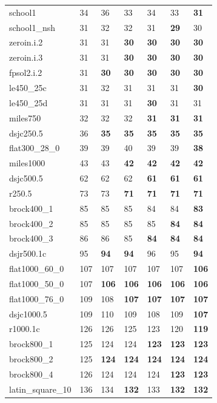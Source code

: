 \documentclass[12pt,a4paper,twoside]{scrartcl}
\numberwithin{equation}{section}
\begin{document}
\begin{table}
\begin{center}
\begin{tabular}{| l | l | l|l|l|l|p{1cm}|}
school1&34&36&33&34&33&\textbf{31}\\ 
school1\_nsh&31&32&32&31&\textbf{29}&30\\ 
zeroin.i.2&31&31&\textbf{30}&\textbf{30}&\textbf{30}&\textbf{30}\\ \hline
zeroin.i.3&31&31&\textbf{30}&\textbf{30}&\textbf{30}&\textbf{30}\\ 
fpsol2.i.2&31&\textbf{30}&\textbf{30}&\textbf{30}&\textbf{30}&\textbf{30}\\ 
le450\_25c&31&32&31&31&31&\textbf{30}\\
le450\_25d&31&31&31&\textbf{30}&31&31\\ 
miles750&32&32&32&\textbf{31}&\textbf{31}&\textbf{31}\\ \hline
dsjc250.5&36&\textbf{35}&\textbf{35}&\textbf{35}&\textbf{35}&\textbf{35}\\ 
flat300\_28\_0&39&39&40&39&39&\textbf{38}\\
miles1000&43&43&\textbf{42}&\textbf{42}&\textbf{42}&\textbf{42}\\ 
dsjc500.5&62&62&62&\textbf{61}&\textbf{61}&\textbf{61}\\ 
r250.5&73&73&\textbf{71}&\textbf{71}&\textbf{71}&\textbf{71}\\ \hline
brock400\_1&85&85&85&84&84&\textbf{83}\\
brock400\_2&85&85&85&85&\textbf{84}&\textbf{84}\\ 
brock400\_3&86&86&85&\textbf{84}&\textbf{84}&\textbf{84}\\ 
dsjr500.1c&95&\textbf{94}&\textbf{94}&96&95&\textbf{94}\\ 
flat1000\_60\_0&107&107&107&107&107&\textbf{106}\\ \hline
flat1000\_50\_0&107&\textbf{106}&\textbf{106}&\textbf{106}&\textbf{106}&\textbf{106}\\ 
flat1000\_76\_0&109&108&\textbf{107}&\textbf{107}&\textbf{107}&\textbf{107}\\ 
dsjc1000.5&109&110&109&108&109&\textbf{107}\\ 
r1000.1c&126&126&125&123&120&\textbf{119}\\ 
brock800\_1&125&124&124&\textbf{123}&\textbf{123}&\textbf{123}\\ \hline
brock800\_2&125&\textbf{124}&\textbf{124}&\textbf{124}&\textbf{124}&\textbf{124}\\ 
brock800\_4&126&124&124&124&\textbf{123}&\textbf{123}\\ 
latin\_square\_10&136&134&\textbf{132}&133&\textbf{132}&\textbf{132}\\ 

\end{tabular}
\end{center}
\end{table}
\end{document}
